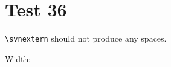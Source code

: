 \documentclass[12pt]{report}
\begin{document}
\chapter{Test 36}
\verb+\svnextern+ should not produce any spaces.

\newlength{\mywidth}
\settowidth{\mywidth}{\svnextern{}}

Width: \the\mywidth\\

\end{document}
